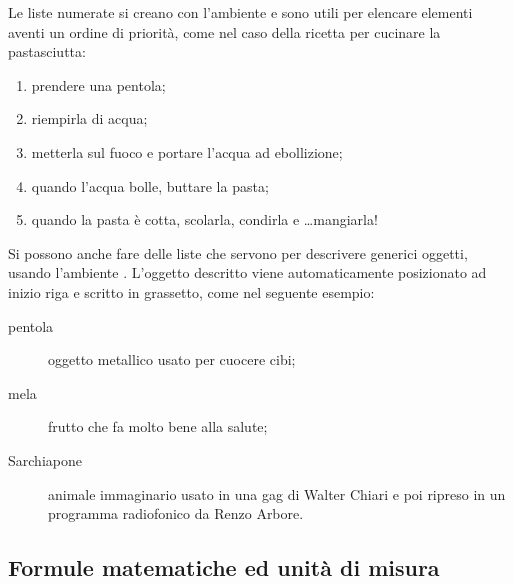 Le liste numerate si creano con l'ambiente  e sono utili per elencare elementi aventi un ordine di priorità, come nel caso della ricetta per cucinare la pastasciutta:
\begin{enumerate}
\item
prendere una pentola;
\item
riempirla di acqua;
\item
metterla sul fuoco e portare l'acqua ad ebollizione;
\item
quando l'acqua bolle, buttare la pasta;
\item
quando la pasta è cotta, scolarla, condirla e \ldots mangiarla!
\end{enumerate}
Si possono anche fare delle liste che servono per descrivere generici oggetti, usando l'ambiente .
L'oggetto descritto viene automaticamente posizionato ad inizio riga e scritto in grassetto, come nel seguente esempio:
\begin{description}
\item[pentola]
oggetto metallico usato per cuocere cibi;
\item[mela]
frutto che fa molto bene alla salute;
\item[Sarchiapone] animale immaginario usato in una gag di Walter Chiari e poi ripreso in un programma radiofonico da Renzo Arbore.
\end{description}


\subsection{Formule matematiche ed unità di misura}

